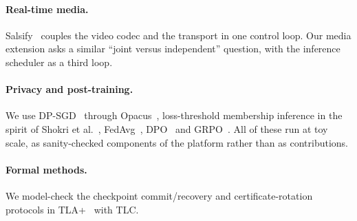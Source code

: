 \paragraph{Real-time media.}
Salsify~\citep{salsify} couples the video codec and the transport in one control loop. Our media extension
asks a similar ``joint versus independent'' question, with the inference scheduler as a third loop.

\paragraph{Privacy and post-training.}
We use DP-SGD~\citep{dpsgd} through Opacus~\citep{opacus}, loss-threshold membership inference in the
spirit of Shokri et al.~\citep{shokri}, FedAvg~\citep{fedavg}, DPO~\citep{dpo} and GRPO~\citep{deepseekmath}. All of
these run at toy scale, as sanity-checked components of the platform rather than as contributions.

\paragraph{Formal methods.}
We model-check the checkpoint commit/recovery and certificate-rotation protocols in TLA+~\citep{tla}
with TLC.
